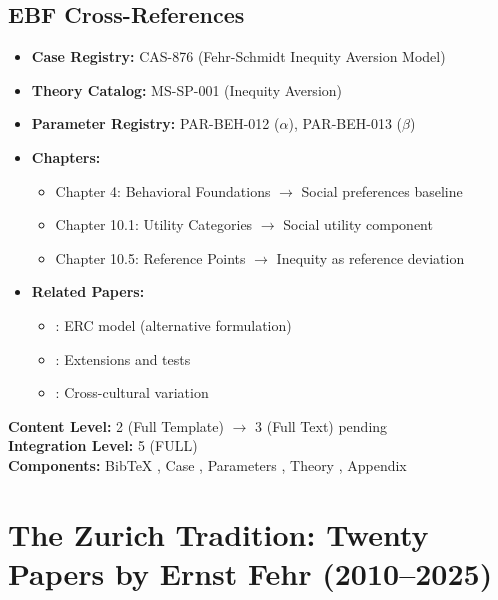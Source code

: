 \subsection{EBF Cross-References}

\begin{itemize}[nosep]
    \item \textbf{Case Registry:} CAS-876 (Fehr-Schmidt Inequity Aversion Model)
    \item \textbf{Theory Catalog:} MS-SP-001 (Inequity Aversion)
    \item \textbf{Parameter Registry:} PAR-BEH-012 ($\alpha$), PAR-BEH-013 ($\beta$)
    \item \textbf{Chapters:}
    \begin{itemize}[nosep]
        \item Chapter 4: Behavioral Foundations $\rightarrow$ Social preferences baseline
        \item Chapter 10.1: Utility Categories $\rightarrow$ Social utility component
        \item Chapter 10.5: Reference Points $\rightarrow$ Inequity as reference deviation
    \end{itemize}
    \item \textbf{Related Papers:}
    \begin{itemize}[nosep]
        \item \citet{PAP-bolton2000erc}: ERC model (alternative formulation)
        \item \citet{PAP-charness2002understanding}: Extensions and tests
        \item \citet{PAP-henrich2001search}: Cross-cultural variation
    \end{itemize}
\end{itemize}

\begin{tcolorbox}[colback=yellow!5!white, colframe=yellow!75!black,
    title=\textbf{Integration Status}]
\textbf{Content Level:} 2 (Full Template) $\rightarrow$ 3 (Full Text) pending \\
\textbf{Integration Level:} 5 (FULL) \checkmark \\
\textbf{Components:} BibTeX \checkmark, Case \checkmark, Parameters \checkmark, Theory \checkmark, Appendix \checkmark
\end{tcolorbox}


\section{The Zurich Tradition: Twenty Papers by Ernst Fehr (2010--2025)}
\label{app:fehrpapers}

